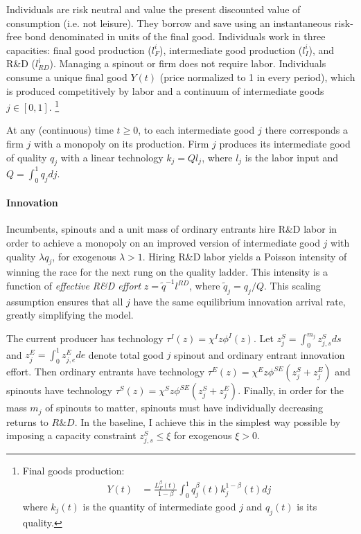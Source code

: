 \documentclass[11pt,english]{article}
\theoremstyle{remark}
\begin{document}
Individuals are risk neutral and value the present discounted value of consumption (i.e. not leisure). They borrow and save using an instantaneous risk-free bond denominated in units of the final good. Individuals work in three capacities: final good production ($l_F^i$), intermediate good production ($l_I^i$), and R\&D ($l_{RD}^i$). Managing a spinout or firm does not require labor. Individuals consume a unique final good $Y(t)$ (price normalized to 1 in every period), which is produced competitively by labor and a continuum of intermediate goods $j \in [0,1]$. \footnote{Final goods production:
\begin{align*}
Y(t) &= \frac{L_F^{\beta}(t)}{1-\beta} \int_0^1 q_j^{\beta}(t) k_j^{1-\beta} (t) dj
\end{align*}
where $k_j(t)$ is the quantity of intermediate good $j$ and $q_j(t)$ is its quality.
}

At any (continuous) time $t \ge 0$, to each intermediate good $j$ there corresponds a firm $j$ with a monopoly on its production. Firm $j$ produces its intermediate good of quality $q_j$ with a linear technology $k_j = Q l_j$, where $l_j$ is the labor input and $Q = \int_0^1 q_j dj$.

\paragraph{Innovation}Incumbents, spinouts and a unit mass of ordinary entrants hire R\&D labor in order to achieve a monopoly on an improved version of intermediate good $j$ with quality $\lambda q_j$, for exogenous $\lambda > 1$. Hiring R\&D labor yields a Poisson intensity of winning the race for the next rung on the quality ladder. This intensity is a function of \textit{effective R\&D effort} $z = \tilde{q}^{-1} l^{RD}$, where $\tilde{q}_j = q_j/Q$. This scaling assumption ensures that all $j$ have the same equilibrium innovation arrival rate, greatly simplifying the model.

The current producer has technology $\tau^I(z) = \chi^I z \phi^I(z)$. Let $z^S_j = \int_0^{m_j} z^S_{j,s} ds$ and $z^E_j = \int_0^1 z^E_{j,e} de$ denote total good $j$ spinout and ordinary entrant innovation effort. Then ordinary entrants have technology $\tau^E(z) = \chi^E z \phi^{SE} (z^S_j + z^E_j)$ and spinouts have technology $\tau^S(z) = \chi^S z \phi^{SE} (z^S_j + z^E_j)$. Finally, in order for the mass $m_j$ of spinouts to matter, spinouts must have individually decreasing returns to $R\&D$. In the baseline, I achieve this in the simplest way possible by imposing a capacity constraint $z^S_{j,s} \le \xi$ for exogenous $\xi > 0$.
\end{document}
